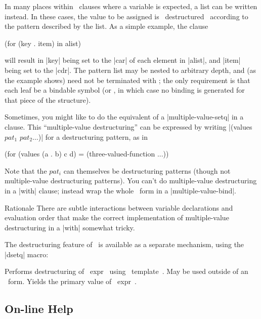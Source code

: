 In many places within \iter\ clauses where a variable is expected, a
list can be written instead.  In these cases, the value to be assigned
is ~destructured~ according to the pattern
described by the list.  As a simple example, the clause
\begin{program}
(for (key . item) in alist)
\end{program}
\noindent will result in |key| being set to the |car| of
each element in |alist|, and |item| being set to the |cdr|.  The
pattern list may be nested to arbitrary depth, and (as the example
shows) need not be terminated with \nil; the only requirement is that
each leaf be a bindable symbol (or \nil, in which case no binding is
generated for that piece of the structure).

Sometimes, you might like to do the equivalent of a
|multiple-value-setq| in a clause.  This 
``multiple-value destructuring'' can be expressed by writing 
\linebreak |(values $pat_1$ $pat_2 \ldots$)| for a destructuring
pattern, as in 
\begin{program}
(for (values (a . b) c d) = (three-valued-function ...))
\end{program}
\begin{sloppypar}
Note that the $pat_i$ can themselves be destructuring patterns (though
not multiple-value destructuring patterns).  You can't do multiple-value
destructuring in a |with| clause; instead wrap the whole \iter\
form in a |multiple-value-bind|.
\end{sloppypar}

\begin{note}{Rationale}
There are subtle interactions between variable declarations and
evaluation order that make the correct implementation of
multiple-value destructuring in a |with| somewhat tricky.
\end{note}

The destructuring feature of \iter\ is available as a separate
mechanism, using the |dsetq| macro:

\begin{clauses}
Performs destructuring of ~expr~ using ~template~.   May be used
outside of an \iter\ form. Yields the primary value of ~expr~.

\end{clauses}

\subsection{On-line Help}

